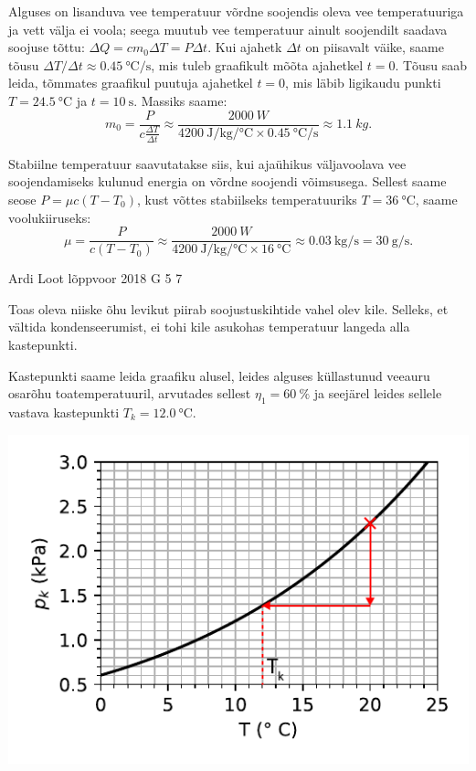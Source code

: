 \documentclass[11pt]{article}
\begin{document}
{{\ifSolution
Alguses on lisanduva vee temperatuur võrdne soojendis oleva vee temperatuuriga ja vett välja ei voola; seega muutub vee temperatuur ainult soojendilt saadava soojuse tõttu: $\Delta Q = c m_0 \Delta T = P \Delta t$. Kui ajahetk $\Delta t$ on piisavalt väike, saame tõusu $\Delta T / \Delta t \approx \SI{0,45}{\celsius\per\second}$, mis tuleb graafikult mõõta ajahetkel $t=0$. Tõusu saab leida, tõmmates graafikul puutuja ajahetkel $t=0$, mis läbib ligikaudu punkti $T=\SI{24.5}{\celsius}$ ja $t = \SI{10}{\second}$. Massiks saame:
$$m_0 = \frac{P}{c \frac{\Delta T}{\Delta t}} \approx \frac{\SI{2000}{W}}{\SI{4200}{\joule \per \kilogram \per \celsius}\times\SI{0,45}{\celsius\per\second}} \approx \SI{1.1}{kg}.$$

Stabiilne temperatuur saavutatakse siis, kui ajaühikus väljavoolava vee soojendamiseks kulunud energia on võrdne soojendi võimsusega. Sellest saame seose $P=\mu c(T-T_0)$, kust võttes stabiilseks temperatuuriks $T=\SI{36}{\celsius}$, saame voolukiiruseks:
$$\mu = \frac{P}{c(T-T_0)} \approx \frac{\SI{2000}{W}}{\SI{4200}{\joule \per \kilogram \per\celsius}\times \SI{16}{\celsius}} \approx \SI{0.03}{\kilogram\per\second}=\SI{30}{\gram\per\second}.$$
\fi
}

{Ardi Loot} %
{lõppvoor} %
{2018} %
{G 5} %
{7} %
{

\ifSolution
Toas oleva niiske õhu levikut piirab soojustuskihtide vahel olev kile.
Selleks, et vältida kondenseerumist, ei tohi kile asukohas temperatuur
langeda alla kastepunkti. 

Kastepunkti saame leida graafiku alusel, leides alguses küllastunud
veeauru osarõhu toatemperatuuril, arvutades sellest $\eta_{1}=\SI{60}{\percent}$
ja seejärel leides sellele vastava kastepunkti $T_{k}=\SI{12.0}{\celsius}.$
\begin{center}
\includegraphics[scale=0.9]{2018-v3g-05-kullastunud-aur-lah}
\par\end{center}

}}
\end{document}
